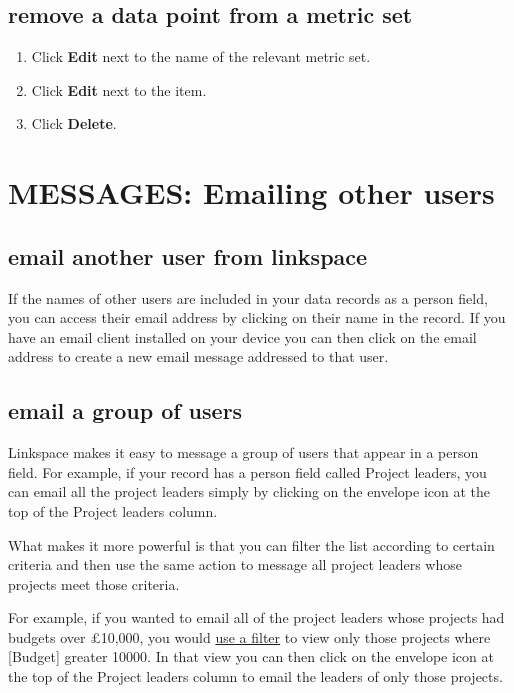 \documentclass{ctrlo-int-toc}
\begin{document}
\begin{admin}
\subsection[remove a data point from a metric set]{remove a data point from a metric set}
\begin{enumerate}
\item Click \textbf{Edit} next to the name of the relevant metric set.
\item Click \textbf{Edit} next to the item.
\item Click \textbf{Delete}.
\end{enumerate}


\clearpage\section[MESSAGES: Emailing other users]{MESSAGES: Emailing other users}
\subsection[email another user from linkspace]{email another user from linkspace}
If the names of other users are included in your data records as a person field, you can access their email address by clicking on their name in the record. If you have an email client installed on your device you can then click on the email address to create a new email message addressed to that user. \ 

\subsection[email a group of users]{email a group of users}
Linkspace makes it easy to message a group of users that appear in a person field. For example, if your record has a person field called Project leaders, you can email all the project leaders simply by clicking on the envelope icon at the top of the Project leaders column.

What makes it more powerful is that you can filter the list according to certain criteria and then use the same action to message all project leaders whose projects meet those criteria. 

For example, if you wanted to email all of the project leaders whose projects had budgets over {\pounds}10,000, you would \hyperref[subsec:viewstofilter]{use a filter} to view only those projects where [Budget] greater 10000. In that view you can then click on the envelope icon at the top of the Project leaders column to email the leaders of only those projects. 


\end{admin}
\end{document}
